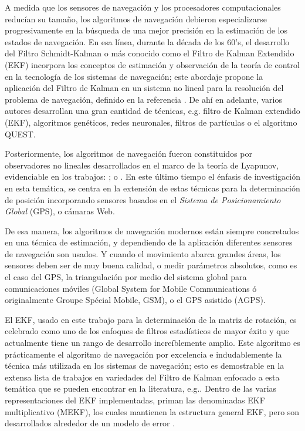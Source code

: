 \documentclass[conference]{IEEEtran}
\begin{document}
A medida que los sensores de navegación y los procesadores computacionales reducían su tamaño, los algoritmos de navegación debieron especializarse progresivamente en la búsqueda de una mejor precisión en la estimación de los estados de navegación. En esa línea, durante la década de los 60's, el desarrollo del Filtro Schmidt-Kalman \cite{Schmidt1966} o más conocido como el Filtro de Kalman Extendido (EKF) incorpora los conceptos de estimación y observación de la teoría de control en la tecnología de los sistemas de navegación; este abordaje propone la aplicación del Filtro de Kalman \cite{Kalman1960} en un sistema no lineal para la resolución del problema de navegación, definido en la referencia \cite{Schmidt1962}. De ahí en adelante, varios autores desarrollan una gran cantidad de técnicas, e.g. filtro de Kalman extendido (EKF), algoritmos genéticos, redes neuronales, filtros de partículas o el algoritmo QUEST.\par
Posteriormente, los algoritmos de navegación fueron constituidos por observadores no lineales desarrollados en el marco de la teoría de Lyapunov, %
evidenciable en los trabajos: \cite{Lukyanov1996}; \cite{Nicosia1996} o \cite{Algrain1997}. En este último tiempo el énfasis de investigación en esta temática, se centra en la extensión de estas técnicas para la determinación de posición incorporando sensores basados en el \emph{Sistema de Posicionamiento Global} (GPS), o cámaras Web.\par
De esa manera, los algoritmos de navegación modernos están siempre concretados en una técnica de estimación, y dependiendo de la aplicación diferentes sensores de navegación son usados. Y cuando el movimiento abarca grandes áreas, los sensores deben ser de muy buena calidad, o medir parámetros absolutos, como es el caso del GPS, la triangulación por medio del sistema global para comunicaciones móviles (Global System for Mobile Communications ó originalmente Groupe Spécial Mobile, GSM), o el GPS asistido (AGPS).\par
El EKF, usado en este trabajo para la determinación de la matriz de rotación, es celebrado como uno de los enfoques de filtros estadísticos de mayor éxito y que actualmente tiene un rango de desarrollo increíblemente amplio. Este algoritmo es prácticamente el algoritmo de navegación por excelencia e indudablemente la técnica más utilizada en los sistemas de navegación; esto es demostrable en la extensa lista de trabajos en variedades del Filtro de Kalman enfocado a esta temática que se pueden encontrar en la literatura, e.g.\cite{Faruki2000, Marins2001, Gandhi2007, Sabatini2006, Bistrovs2012}. Dentro de las varias representaciones del EKF implementadas, priman las denominadas EKF multiplicativo (MEKF), los cuales mantienen la estructura general EKF, pero son desarrollados alrededor de un modelo de error \cite{Friedland1978,Benson1975}.\par
\end{document}
